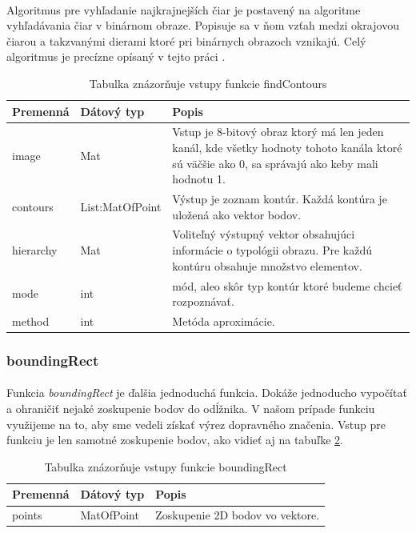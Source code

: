 \documentclass[12pt]{article}
\begin{document}
\paragraph{}
Algoritmus pre vyhľadanie najkrajnejších čiar je postavený na algoritme vyhľadávania čiar v binárnom obraze. Popisuje sa v ňom vzťah medzi okrajovou čiarou a takzvanými dierami ktoré pri binárnych obrazoch vznikajú. Celý algoritmus je precízne opísaný v tejto práci
\cite{suzuky}.
\begin{table}
	\centering
    \begin{tabular}{ | l | l | p{5cm} |}
    \hline
    Premenná & Dátový typ & Popis \\ \hline
    image & Mat & Vstup je 8-bitový obraz ktorý má len jeden kanál, kde všetky hodnoty tohoto kanála ktoré sú väčšie ako 0, sa správajú ako keby mali hodnotu 1. \\ \hline
    contours & List:MatOfPoint & Výstup je zoznam kontúr. Každá kontúra je uložená ako vektor bodov. \\ \hline
    hierarchy & Mat & Voliteľný výstupný vektor obsahujúci informácie o typológii obrazu. Pre každú kontúru obsahuje množstvo elementov. \\ \hline
    mode & int & mód, aleo skôr typ kontúr ktoré budeme chcieť rozpoznávať. \\ \hline
    method & int & Metóda aproximácie. \\
    \hline
    \end{tabular}
  	\caption{Tabulka znázorňuje vstupy funkcie findContours}
  	\label{findContoursPar}
\end{table}
\subsubsection{boundingRect}
\paragraph{}
Funkcia \emph{boundingRect} je ďalšia jednoduchá funkcia. Dokáže jednoducho vypočítať a ohraničiť nejaké zoskupenie bodov do odĺžnika.
V našom prípade funkciu využijeme na to, aby sme vedeli získať výrez dopravného značenia. Vstup pre funkciu je len samotné zoskupenie bodov, ako vidieť aj na tabuľke \ref{boundingRectPar}.
\cite{OpenCVDoc}
\begin{table}
	\centering
    \begin{tabular}{ | l | l | p{5cm} |}
    \hline
    Premenná & Dátový typ & Popis \\ \hline
    points & MatOfPoint & Zoskupenie 2D bodov vo vektore. \\ 
    \hline
    \end{tabular}
  	\caption{Tabulka znázorňuje vstupy funkcie boundingRect}
  	\label{boundingRectPar}
\end{table}
\end{document}
